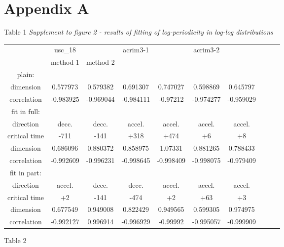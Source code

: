\documentclass[a4paper]{article}
\begin{document}
\newpage
\section*{Appendix A}

Table 1 \textit{Supplement to figure 2 - results of fitting of log-periodicity in log-log distributions}
\vskip 12pt

{\small{

\begin{tabular}{cccccccccc}
\hline
             & usc\_18        &           & acrim3-1  &           & acrim3-2  &           \\
             & method 1       & method 2  &           &           &           &           \\
\hline
plain: \\
dimension     & 0.577973  & 0.579382  & 0.691307  & 0.747027  & 0.598869  & 0.645797  \\
correlation   & -0.983925 & -0.969044 & -0.984111 & -0.97212  & -0.974277 & -0.959029 \\
\hline
fit in full: \\ 
direction     & decc.     & decc.     & accel.    & accel.    & accel.    & accel.    \\
critical time & -711      & -141      & +318      & +474      & +6        & +8        \\
dimension     & 0.686096  & 0.880372  & 0.858975  & 1.07331   & 0.881265  & 0.788433  \\
correlation   & -0.992609 & -0.996231 & -0.998645 & -0.998409 & -0.998075 & -0.979409 \\
\hline
fit in part: \\
direction     & accel.    & decc.     & decc.     & accel.    & accel.    & accel.    \\
critical time & +2        & -141      & -474      & +2        & +63       & +3        \\
dimension     & 0.677549  & 0.949008  & 0.822429  & 0.949565  & 0.599305  & 0.974975  \\
correlation   & -0.992127 & 0.996914  & -0.996929 & -0.99992  & -0.995057 & -0.999909 \\
\hline
\end{tabular}

}}

\vskip 12pt

Table 2 \textit{}
\end{document}
